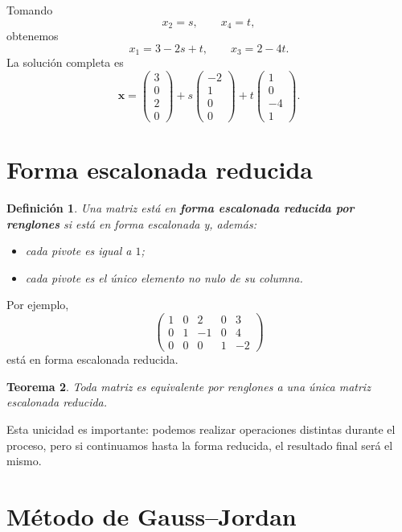 \documentclass[12pt]{article}
\newtheorem{definicion}{Definición}[section]
\newtheorem{teorema}[definicion]{Teorema}
\theoremstyle{remark}
\begin{document}
Tomando
\[
x_2=s,\qquad x_4=t,
\]
obtenemos
\[
x_1=3-2s+t,\qquad x_3=2-4t.
\]
La solución completa es
\[
\mathbf{x}=
\begin{pmatrix}3\\0\\2\\0\end{pmatrix}
+s\begin{pmatrix}-2\\1\\0\\0\end{pmatrix}
+t\begin{pmatrix}1\\0\\-4\\1\end{pmatrix}.
\]
\section*{Forma escalonada reducida}

\begin{definicion}
Una matriz está en \textbf{forma escalonada reducida por renglones} si está en forma escalonada y, además:
\begin{itemize}
\item cada pivote es igual a $1$;
\item cada pivote es el único elemento no nulo de su columna.
\end{itemize}
\end{definicion}

Por ejemplo,
\[
\begin{pmatrix}
1&0&2&0&3\\
0&1&-1&0&4\\
0&0&0&1&-2
\end{pmatrix}
\]
está en forma escalonada reducida.

\begin{teorema}
Toda matriz es equivalente por renglones a una única matriz escalonada reducida.
\end{teorema}

Esta unicidad es importante: podemos realizar operaciones distintas durante el proceso, pero si continuamos hasta la forma reducida, el resultado final será el mismo.

\section{Método de Gauss--Jordan}
\end{document}
